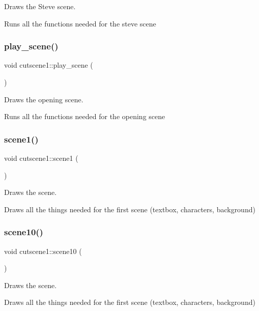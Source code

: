 Draws the Steve scene. 

Runs all the functions needed for the steve scene \mbox{\label{classcutscene1_af4c8e7ddc01274a70da482e1d7f56a14}} 
\subsubsection{\texorpdfstring{play\+\_\+scene()}{play\_scene()}}
{\footnotesize\ttfamily void cutscene1\+::play\+\_\+scene (\begin{DoxyParamCaption}{ }\end{DoxyParamCaption})}



Draws the opening scene. 

Runs all the functions needed for the opening scene \mbox{\label{classcutscene1_a169d9eef0707c691dbb2eb94ad07f844}} 
\subsubsection{\texorpdfstring{scene1()}{scene1()}}
{\footnotesize\ttfamily void cutscene1\+::scene1 (\begin{DoxyParamCaption}{ }\end{DoxyParamCaption})}



Draws the scene. 

Draws all the things needed for the first scene (textbox, characters, background) \mbox{\label{classcutscene1_ad8352de19bf15b9b1104b76d4c278be8}} 
\subsubsection{\texorpdfstring{scene10()}{scene10()}}
{\footnotesize\ttfamily void cutscene1\+::scene10 (\begin{DoxyParamCaption}{ }\end{DoxyParamCaption})}



Draws the scene. 

Draws all the things needed for the first scene (textbox, characters, background) \mbox{\label{classcutscene1_ac86b4ca661908ea43d5b672f3fc359c3}} 
